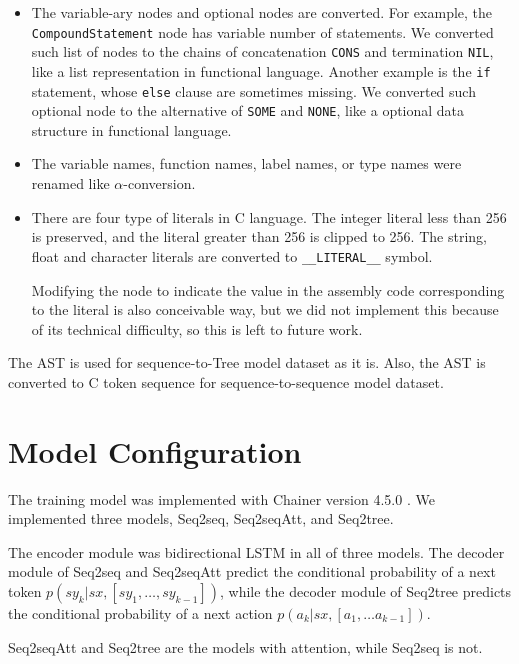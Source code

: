\documentclass[senior,final,11pt]{iscs-thesis}
\begin{document}
\begin{itemize}
\item The variable-ary nodes and optional nodes are converted. 
For example, the \texttt{CompoundStatement} node has variable number of statements. 
We converted such list of nodes to the chains of concatenation \texttt{CONS} and termination \texttt{NIL}, like a list representation in functional language.
Another example is the \texttt{if} statement, whose \texttt{else} clause are sometimes missing. 
We converted such optional node to the alternative of \texttt{SOME} and \texttt{NONE}, like a optional data structure in functional language.
\item The variable names, function names, label names, or type names were renamed like $\alpha$-conversion.
\item There are four type of literals in C language. 
The integer literal less than 256 is preserved, and the literal greater than 256 is clipped to 256.
The string, float and character literals are converted to \texttt{\_\_LITERAL\_\_} symbol.

Modifying the node to indicate the value in the assembly code corresponding to the literal is also conceivable way,
but we did not implement this because of its technical difficulty, so this is left to future work.
\end{itemize}

The AST is used for sequence-to-Tree model dataset as it is.
Also, the AST is converted to C token sequence for sequence-to-sequence model dataset. 

\section{Model Configuration}
The training model was implemented with Chainer version 4.5.0 \citep{chainer}.
We implemented three models, Seq2seq, Seq2seqAtt, and Seq2tree.

The encoder module was bidirectional LSTM in all of three models.
The decoder module of Seq2seq and Seq2seqAtt predict the conditional probability of a next token $ p(sy_k|sx,[sy_1,\dots,sy_{k-1}]) $,
while the decoder module of Seq2tree predicts the conditional probability of a next action $ p(a_{k}|sx,[a_1, \dots a_{k-1}]) $.

Seq2seqAtt and Seq2tree are the models with attention, while Seq2seq is not.
\end{document}
